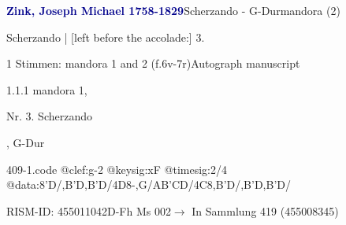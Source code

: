 \documentclass[twocolumn, 12pt]{book}
\begin{document}
\par \vspace{16pt} \textcolor{darkblue}{\textbf{Zink, Joseph Michael  1758-1829}}\hfillplus{\textbf{[409]}}\newline Scherzando - G-Dur\newline mandora (2)
\par \begin{itshape} Scherzando | [left before the accolade:] 3.\end{itshape} 
\par \textcolor{darkblue}{}  1 Stimmen: mandora 1 and 2  (f.6v-7r)\newline Autograph manuscript
\par 1.1.1  mandora 1, \begin{itshape}Nr. 3. Scherzando\end{itshape}, G-Dur  
\begin{filecontents*}{409-1.code}
@clef:g-2
@keysig:xF
@timesig:2/4
@data:8'D/,B'D,B'D/4D8-,G/AB'CD/4C8,B'D/,B'D,B'D/
\end{filecontents*}
\newline %
\par RISM-ID: 455011042\newline D-Fh  Ms 002\newline $\rightarrow$ In Sammlung 419 (455008345)
      
\end{document}
